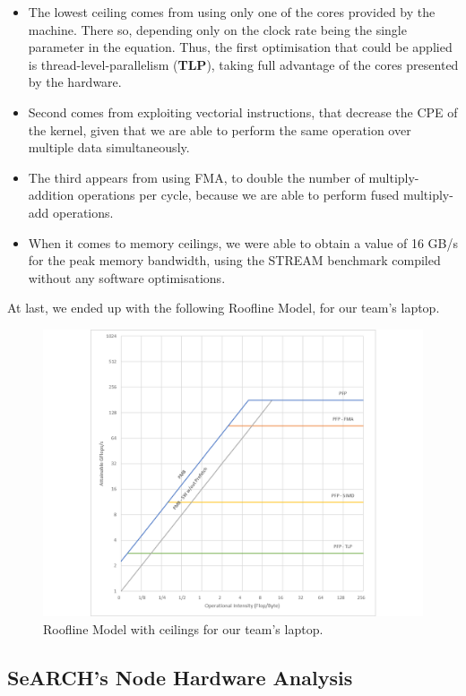 \documentclass[twoside,twocolumn]{article}
\begin{document}
\begin{itemize}
    \item The lowest ceiling comes from using only one of the cores provided by the machine. There so, depending only on the clock rate being the single parameter in the equation. Thus, the first optimisation that could be applied is thread-level-parallelism (\textbf{TLP}), taking full advantage of the cores presented by the hardware.
    \item Second comes from exploiting vectorial instructions, that decrease the CPE of the kernel, given that we are able to perform the same operation over multiple data simultaneously. 
    \item The third appears from using FMA, to double the number of multiply-addition operations per cycle, because we are able to perform fused multiply-add operations.
    \item When it comes to memory ceilings, we were able to obtain a value of  16 GB/s for the peak memory bandwidth, using the STREAM benchmark compiled without any software optimisations.
\end{itemize}

At last, we ended up with the following Roofline Model, for our team's laptop.

\begin{figure}[H]
    \includegraphics[width=\linewidth]{laptop_roofline_ceilings.png}
    \centering
    \caption{Roofline Model with ceilings for our team's laptop.}
    \label{fig:roofline_ceil}
\end{figure}

\subsection{SeARCH's Node Hardware Analysis}
\end{document}
